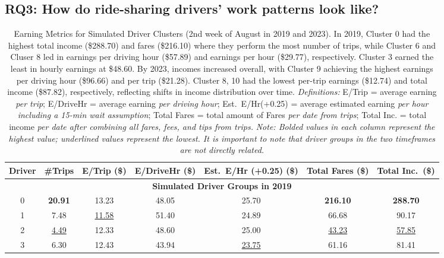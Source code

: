 \subsection{RQ3: How do ride-sharing drivers' work patterns look like?}
\begin{table}[ht]
\centering
\caption{
  Earning Metrics for Simulated Driver Clusters (2nd week of August in 2019 and 2023). In 2019, Cluster 0 had the highest total income (\$288.70) and fares (\$216.10) where they perform the most number of trips, while Cluster 6 and Cluser 8 led in earnings per driving hour (\$57.89) and earnings per hour (\$29.77), respectively. Cluster 3 earned the least in hourly earnings at \$48.60. By 2023, incomes increased overall, with Cluster 9 achieving the highest earnings per driving hour (\$96.66) and per trip (\$21.28). Cluster 8, 10 had the lowest per-trip earnings (\$12.74) and total income (\$87.82), respectively, reflecting shifts in income distribution over time.
  \newline
  \emph{Definitions:} 
  E/Trip = average earning \emph{per trip}; 
  E/DriveHr = average earning \emph{per driving hour}; 
  Est.\ E/Hr(+0.25) = average estimated earning \emph{per hour including a 15-min wait assumption}; 
  Total Fares = total amount of Fares \emph{per date from trips}; 
  Total Inc. = total income \emph{per date after combining all fares, fees, and tips from trips.} 
  \newline
  \emph{Note: Bolded values in each column represent the highest value; underlined values represent the lowest. It is important to note that driver groups in the two timeframes are not directly related.}
}
\label{tab:predict_cluster_case_2_no_cluster_9}
\begin{tabular}{ccccccc}
\toprule
\textbf{Driver} & 
\textbf{\#Trips} & 
\textbf{E/Trip (\$)} & 
\textbf{E/DriveHr (\$)} & 
\textbf{Est.\ E/Hr (+0.25) (\$)} & 
\textbf{Total Fares (\$)} & 
\textbf{Total Inc.\ (\$)}\\
\midrule
\multicolumn{7}{c}{\textbf{Simulated Driver Groups in 2019}}\\
\midrule
0 & \textbf{20.91} & 13.23 & 48.05 & 25.70 & \textbf{216.10} & \textbf{288.70} \\
1 & 7.48 & \underline{11.58} & 51.40 & 24.89 & 66.68 & 90.17 \\
2 & \underline{4.49} & 12.33 & 48.60 & 25.00 & \underline{43.23} & \underline{57.85} \\
3 & 6.30 & 12.43 & 43.94 & \underline{23.75} & 61.16 & 81.41 \\

\end{tabular}
\end{table}
